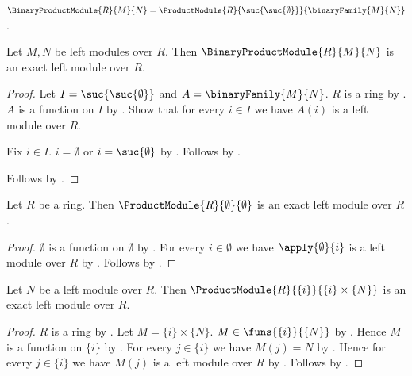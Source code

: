 \begin{definition}\label{binary_product_module}
    $\BinaryProductModule{R}{M}{N}
        =\ProductModule{R}{\suc{\suc{\emptyset}}}{
            \binaryFamily{M}{N}}$.
\end{definition}

\begin{proposition}\label{binary_product_module_is_exact}
    Let $M,N$ be left modules over $R$.
    Then $\BinaryProductModule{R}{M}{N}$
        is an exact left module over $R$.
\end{proposition}
\begin{proof}
    Let $I=\suc{\suc{\emptyset}}$ and $A=\binaryFamily{M}{N}$.
    $R$ is a ring by .
    $A$ is a function on $I$ by
        .
    Show that for every $i\in I$ we have
        $A(i)$ is a left module over $R$.
    \begin{subproof}
        Fix $i\in I$.
        $i=\emptyset$ or $i=\suc{\emptyset}$ by
            .
        Follows by .
    \end{subproof}
    Follows by .
\end{proof}

\begin{proposition}\label{empty_product_module_is_exact}
    Let $R$ be a ring.
    Then $\ProductModule{R}{\emptyset}{\emptyset}$
        is an exact left module over $R$.
\end{proposition}
\begin{proof}
    $\emptyset$ is a function on $\emptyset$ by
        .
    For every $i\in\emptyset$ we have
        $\apply{\emptyset}{i}$ is a left module over $R$ by
        .
    Follows by .
\end{proof}

\begin{proposition}\label{singleton_product_module_is_exact}
    Let $N$ be a left module over $R$.
    Then $\ProductModule{R}{\{i\}}{\{i\}\times\{N\}}$
        is an exact left module over $R$.
\end{proposition}
\begin{proof}
    $R$ is a ring by .
    Let $M=\{i\}\times\{N\}$.
    $M\in\funs{\{i\}}{\{N\}}$ by .
    Hence $M$ is a function on $\{i\}$ by
        .
    For every $j\in\{i\}$ we have $M(j)=N$ by
        .
    Hence for every $j\in\{i\}$ we have
        $M(j)$ is a left module over $R$ by \auto.
    Follows by .
\end{proof}

